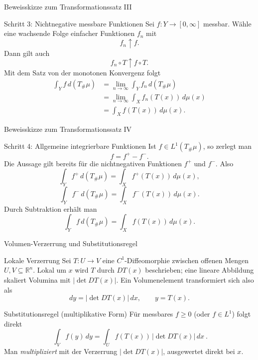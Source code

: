 \documentclass{beamer}
\begin{document}
\begin{frame}{Beweisskizze zum Transformationssatz III}
\begin{block}{Schritt 3: Nichtnegative messbare Funktionen}
Sei \(f\colon Y\to[0,\infty]\) messbar.
Wähle eine wachsende Folge einfacher Funktionen \(f_n\) mit
\[
f_n\uparrow f.
\]
Dann gilt auch
\[
f_n\circ T \uparrow f\circ T.
\]
Mit dem Satz von der monotonen Konvergenz folgt
\begin{align*}
\int_Y f\,d(T_\#\mu)
&=
\lim_{n\to\infty}\int_Y f_n\,d(T_\#\mu)\\
&=
\lim_{n\to\infty}\int_X f_n(T(x))\,d\mu(x)\\
&=
\int_X f(T(x))\,d\mu(x).
\end{align*}
\end{block}
\end{frame}

\begin{frame}{Beweisskizze zum Transformationssatz IV}
\begin{block}{Schritt 4: Allgemeine integrierbare Funktionen}
Ist \(f\in L^1(T_\#\mu)\), so zerlegt man
\[
f=f^+-f^-.
\]
Die Aussage gilt bereits für die nichtnegativen Funktionen \(f^+\) und \(f^-\). Also
\[
\int_Y f^+\,d(T_\#\mu)
=
\int_X f^+(T(x))\,d\mu(x),
\]
\[
\int_Y f^-\,d(T_\#\mu)
=
\int_X f^-(T(x))\,d\mu(x).
\]
Durch Subtraktion erhält man
\[
\int_Y f\,d(T_\#\mu)
=
\int_X f(T(x))\,d\mu(x).
\]
\end{block}
\end{frame}

\begin{frame}{Volumen-Verzerrung und Substitutionsregel}
\begin{block}{Lokale Verzerrung}
Sei \(T\colon U\to V\) eine \(C^1\)-Diffeomorphie zwischen offenen Mengen \(U,V\subseteq\mathbb R^n\). Lokal um \(x\) wird \(T\) durch \(DT(x)\) beschrieben; eine lineare Abbildung skaliert Volumina mit \(|\det DT(x)|\). Ein Volumenelement transformiert sich also als
\[
dy=|\det DT(x)|\,dx,\qquad y=T(x).
\]
\end{block}
\begin{block}{Substitutionsregel (multiplikative Form)}
Für messbares \(f\ge 0\) (oder \(f\in L^1\)) folgt direkt
\[
\boxed{\ \int_V f(y)\,dy=\int_U f(T(x))\,|\det DT(x)|\,dx\ }.
\]
Man \emph{multipliziert} mit der Verzerrung \(|\det DT(x)|\), ausgewertet direkt bei \(x\).
\end{block}
\end{frame}
\end{document}
